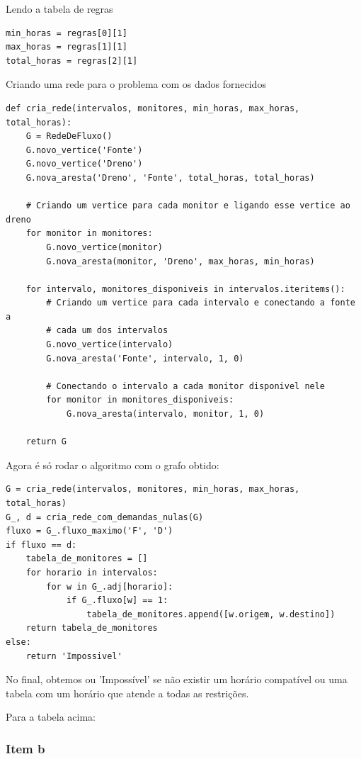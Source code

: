\documentclass[11pt]{article}
\begin{document}
Lendo a tabela de regras
\begin{verbatim}
min_horas = regras[0][1]
max_horas = regras[1][1]
total_horas = regras[2][1]
\end{verbatim}

Criando uma rede para o problema com os dados fornecidos

\begin{verbatim}
def cria_rede(intervalos, monitores, min_horas, max_horas, total_horas):
    G = RedeDeFluxo()
    G.novo_vertice('Fonte')
    G.novo_vertice('Dreno')
    G.nova_aresta('Dreno', 'Fonte', total_horas, total_horas)

    # Criando um vertice para cada monitor e ligando esse vertice ao dreno
    for monitor in monitores:
        G.novo_vertice(monitor)
        G.nova_aresta(monitor, 'Dreno', max_horas, min_horas)

    for intervalo, monitores_disponiveis in intervalos.iteritems():
        # Criando um vertice para cada intervalo e conectando a fonte a
        # cada um dos intervalos
        G.novo_vertice(intervalo)
        G.nova_aresta('Fonte', intervalo, 1, 0)

        # Conectando o intervalo a cada monitor disponivel nele
        for monitor in monitores_disponiveis:
            G.nova_aresta(intervalo, monitor, 1, 0)

    return G
\end{verbatim}

Agora é só rodar o algoritmo com o grafo obtido:
\begin{verbatim}
G = cria_rede(intervalos, monitores, min_horas, max_horas, total_horas)
G_, d = cria_rede_com_demandas_nulas(G)
fluxo = G_.fluxo_maximo('F', 'D')
if fluxo == d:
    tabela_de_monitores = []
    for horario in intervalos:
        for w in G_.adj[horario]:
            if G_.fluxo[w] == 1:
                tabela_de_monitores.append([w.origem, w.destino])
    return tabela_de_monitores
else:
    return 'Impossivel'
\end{verbatim}

No final, obtemos ou 'Impossível' se não existir um horário compatível
ou uma tabela com um horário que atende a todas as restrições.

Para a tabela acima:

\subsubsection{Item b}
\label{sec-1-6-2}
\end{document}

